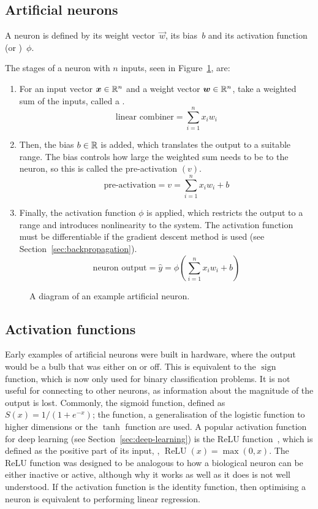 \subsection{Artificial neurons}

A neuron is defined by its weight vector~\(\vec{w}\), its bias~\(b\) and its activation function (or )~\(\phi\).

The stages of a neuron with \(n\) inputs, seen in Figure~\ref{fig:neuron-example}, are:
\begin{enumerate}
	\item For an input vector \(\bm{x} \in \mathbb{R}^n\) and a weight vector \(\bm{w} \in \mathbb{R}^n\), take a weighted sum of the inputs, called a .
	      \[ \text{linear combiner} = \sum_{i=1}^{n}{x_i w_i} \]
	\item Then, the bias \(b \in \mathbb{R}{}\) is added, which translates the output to a suitable range.
	      The bias controls how large the weighted sum needs to be to  the neuron, so this is called the pre-activation \((v)\).
	      \[ \text{pre-activation} = v = \sum_{i=1}^{n}{x_i w_i} + b \]
	\item Finally, the activation function \(\phi\) is applied, which restricts the output to a range and introduces nonlinearity to the system.
	      The activation function must be differentiable if the gradient descent method is used (see Section~\ref{sec:backpropagation}).
	      \[ \text{neuron output} = \hat{y} = \phi\left(\sum_{i=1}^{n}{x_i w_i} + b \right) \]
\end{enumerate}

\begin{figure}[htbp]
	\centering
	
	\caption{A diagram of an example artificial neuron.}
	\label{fig:neuron-example}
\end{figure}

\subsection{Activation functions} \label{sec:activation-functions}

Early examples of artificial neurons were built in hardware, where the output would be a bulb that was either on or off.
This is equivalent to the \(\operatorname{sign}\) function, which is now only used for binary classification problems.
It is not useful for connecting to other neurons, as information about the magnitude of the output is lost.
Commonly, the sigmoid function, defined as \(S(x) = 1/(1 + e^{-x})\); the  function, a generalisation of the logistic function to higher dimensions or the \(\tanh\) function are used.
A popular activation function for deep learning (see Section~\ref{sec:deep-learning}) is the \ac{ReLU} function~\autocite{ramachandran2017}, which is defined as the positive part of its input, \ie{}, \(\operatorname{ReLU}(x) = \max(0, x)\).
The \ac{ReLU} function was designed to be analogous to how a biological neuron can be either inactive or active, although why it works as well as it does is not well understood.
If the activation function is the identity function, then optimising a neuron is equivalent to performing linear regression.

